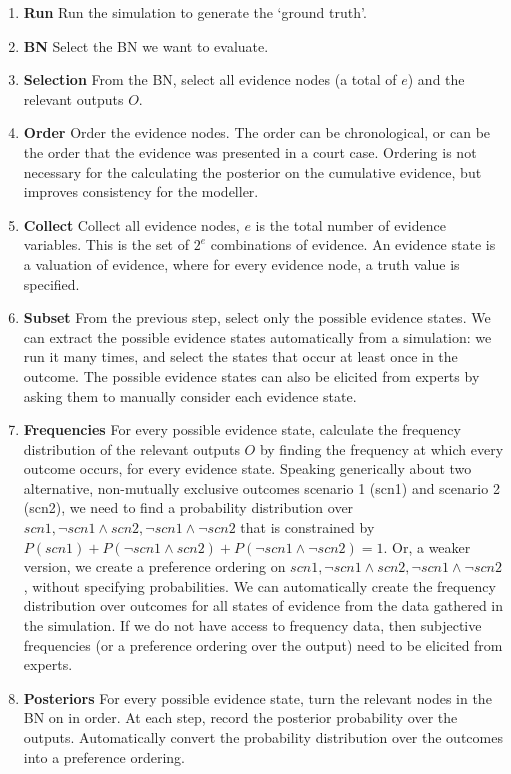 \documentclass[12pt]{article}
\begin{document}
\begin{enumerate}
\item \textbf{Run} Run the simulation to generate the `ground truth'. 
\item \textbf{BN} Select the BN we want to evaluate.
\item \textbf{Selection} From the BN, select all evidence nodes (a total of $e$) and the relevant outputs $O$.
\item \textbf{Order} Order the evidence nodes. The order can be chronological, or can be the order that the evidence was presented in a court case. Ordering is not necessary for the calculating the posterior on the cumulative evidence, but improves consistency for the modeller.
\item \textbf{Collect} Collect all evidence nodes, $e$ is the total number of evidence variables. This is the set of $2^e$ combinations of evidence. An evidence state is a valuation of evidence, where for every evidence node, a truth value is specified. 
\item \textbf{Subset} From the previous step, select only the possible evidence states. We can extract the possible evidence states automatically from a simulation: we run it many times, and select the states that occur at least once in the outcome. The possible evidence states can also be elicited from experts by asking them to manually consider each evidence state.
\item \textbf{Frequencies} For every possible evidence state, calculate the frequency distribution of the relevant outputs $O$ by finding the frequency at which every outcome occurs, for every evidence state. Speaking generically about two alternative, non-mutually exclusive outcomes scenario 1 (scn1) and scenario 2 (scn2), we need to find a probability distribution over $scn1, \neg scn1 \land scn2, \neg scn1 \land \neg scn2$ that is constrained by $P(scn1) + P(\neg scn1 \land scn2) + P(\neg scn1 \land \neg scn2) = 1$. Or, a weaker version, we create a preference ordering on $scn1, \neg scn1 \land scn2, \neg scn1 \land \neg scn2$, without specifying probabilities. 
We can automatically create the frequency distribution over outcomes for all states of evidence from the data gathered in the simulation. If we do not have access to frequency data, then subjective frequencies (or a preference ordering over the output) need to be elicited from experts.
\item \textbf{Posteriors} For every possible evidence state, turn the relevant nodes in the BN on in order. At each step, record the posterior probability over the outputs. Automatically convert the probability distribution over the outcomes into a preference ordering.

\end{enumerate}
\end{document}

